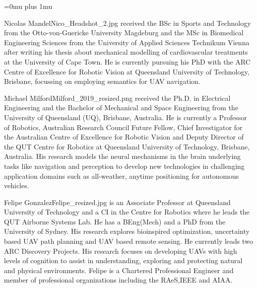 \documentclass[twocolumn,letterpaper]{IEEEAerospaceCLS}  %
\begin{document}




\Urlmuskip=0mu plus 1mu\relax
\thebiography
\begin{biographywithpic}{Nicolas Mandel}{Nico_Headshot_2.jpg}
    received the BSc in Sports and Technology from the Otto-von-Guericke University Magdeburg and the MSc in Biomedical Engineering Sciences from the University of Applied Sciences Technikum Vienna after writing his thesis about mechanical modelling of cardiovascular treatments at the University of Cape Town. He is currently pursuing his PhD with the ARC Centre of Excellence for Robotic Vision at Queensland University of Technology, Brisbane, focussing on employing semantics for UAV navigation.
\end{biographywithpic}

\begin{biographywithpic}{Michael Milford}{Milford_2019_resized.png}
    received the Ph.D. in Electrical Engineering and the Bachelor of Mechanical and Space Engineering from the University of Queensland (UQ), Brisbane, Australia. He is currently a Professor of Robotics, Australian Research Council Future Fellow, Chief Investigator for the Australian Centre of Excellence for Robotic Vision and Deputy Director of the QUT Centre for Robotics at Queensland University of Technology, Brisbane, Australia. His research models the neural mechanisms in the brain underlying tasks like navigation and perception to develop new technologies in challenging application domains such as all-weather, anytime positioning for autonomous vehicles.
\end{biographywithpic}

\begin{biographywithpic}{Felipe Gonzalez}{Felipe_resized.jpg}
    is an Associate Professor at Queensland University of Technology and a CI in the Centre for Robotics where he leads the QUT Airborne Systems Lab. He has a BEng(Mech) and a PhD from the University of Sydney. His research explores bioinspired optimization, uncertainty based UAV path planning and UAV based remote sensing. He currently leads two ARC Discovery Projects. His research focuses on developing UAVs with high levels of cognition to assist in understanding, exploring and protecting natural and physical environments. Felipe is a Chartered Professional Engineer and member of professional organizations including the RAeS,IEEE and AIAA.
\end{biographywithpic}
\end{document}
